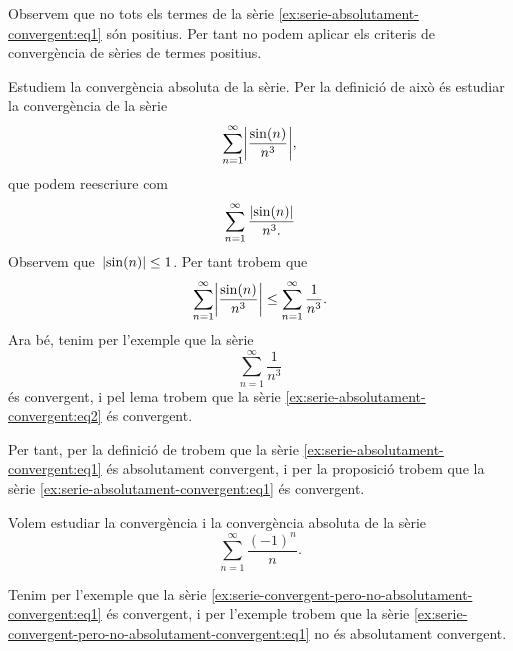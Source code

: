 \documentclass[../../main.tex]{subfiles}
\begin{document}
    \begin{solution}
        Observem que no tots els termes de la sèrie \eqref{ex:serie-absolutament-convergent:eq1} són positius.
        Per tant no podem aplicar els criteris de convergència de sèries de termes positius.

        Estudiem la convergència absoluta de la sèrie.
        Per la definició de  això és estudiar la convergència de la sèrie
        \begin{equation}
            \label{ex:serie-absolutament-convergent:eq2}
            \sum_{n=1}^{\infty}\abs{\frac{\sin(n)}{n^{3}}},
        \end{equation}
        que podem reescriure com
        \[
            \sum_{n=1}^{\infty}\frac{\abs{\sin(n)}}{n^{3}.}
        \]
        Observem que~\(\abs{\sin(n)}\leq1\).
        Per tant trobem que
        \[
            \sum_{n=1}^{\infty}\abs{\frac{\sin(n)}{n^{3}}}\leq\sum_{n=1}^{\infty}\frac{1}{n^{3}}.
        \]
        Ara bé, tenim per l'exemple  que la sèrie
        \[
            \sum_{n=1}^{\infty}\frac{1}{n^{3}}
        \]
        és convergent, i pel lema  trobem que la sèrie \eqref{ex:serie-absolutament-convergent:eq2} és convergent.

        Per tant, per la definició de  trobem que la sèrie \eqref{ex:serie-absolutament-convergent:eq1} és absolutament convergent, i per la proposició  trobem que la sèrie \eqref{ex:serie-absolutament-convergent:eq1} és convergent.
    \end{solution}
    \begin{example} %
        \label{ex:serie-convergent-pero-no-absolutament-convergent}
        Volem estudiar la convergència i la convergència absoluta de la sèrie
        \begin{equation}
            \label{ex:serie-convergent-pero-no-absolutament-convergent:eq1}
            \sum_{n=1}^{\infty}\frac{(-1)^{n}}{n}.
        \end{equation}
    \end{example}
    \begin{solution}
        Tenim per l'exemple  que la sèrie \eqref{ex:serie-convergent-pero-no-absolutament-convergent:eq1} és convergent, i per l'exemple  trobem que la sèrie \eqref{ex:serie-convergent-pero-no-absolutament-convergent:eq1} no és absolutament convergent.
    \end{solution}
\end{document}
